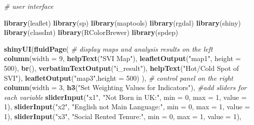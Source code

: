 \documentclass[]{article}
\newenvironment{Shaded}{\begin{snugshade}}{\end{snugshade}}
\newcommand{\KeywordTok}[1]{\textcolor[rgb]{0.13,0.29,0.53}{\textbf{#1}}}
\newcommand{\DataTypeTok}[1]{\textcolor[rgb]{0.13,0.29,0.53}{#1}}
\newcommand{\DecValTok}[1]{\textcolor[rgb]{0.00,0.00,0.81}{#1}}
\newcommand{\StringTok}[1]{\textcolor[rgb]{0.31,0.60,0.02}{#1}}
\newcommand{\CommentTok}[1]{\textcolor[rgb]{0.56,0.35,0.01}{\textit{#1}}}
\newcommand{\NormalTok}[1]{#1}
\begin{document}
\begin{Shaded}
\begin{Highlighting}[]
\CommentTok{# user interface}

\KeywordTok{library}\NormalTok{(leaflet)}
\KeywordTok{library}\NormalTok{(sp)}
\KeywordTok{library}\NormalTok{(maptools)}
\KeywordTok{library}\NormalTok{(rgdal)}
\KeywordTok{library}\NormalTok{(shiny)}
\KeywordTok{library}\NormalTok{(classInt)}
\KeywordTok{library}\NormalTok{(RColorBrewer)}
\KeywordTok{library}\NormalTok{(spdep)}

\KeywordTok{shinyUI}\NormalTok{(}\KeywordTok{fluidPage}\NormalTok{(}
  \CommentTok{# display maps and analysis results on the left}
  \KeywordTok{column}\NormalTok{(}\DataTypeTok{width =} \DecValTok{9}\NormalTok{,}
         \KeywordTok{helpText}\NormalTok{(}\StringTok{"SVI Map"}\NormalTok{),}
         \KeywordTok{leafletOutput}\NormalTok{(}\StringTok{"map1"}\NormalTok{, }\DataTypeTok{height =} \DecValTok{500}\NormalTok{),}
         \KeywordTok{br}\NormalTok{(),}
         \KeywordTok{verbatimTextOutput}\NormalTok{(}\StringTok{"i_result"}\NormalTok{),}
         \KeywordTok{helpText}\NormalTok{(}\StringTok{"Hot/Cold Spot of SVI"}\NormalTok{),}
         \KeywordTok{leafletOutput}\NormalTok{(}\StringTok{"map3"}\NormalTok{,}\DataTypeTok{height =} \DecValTok{500}\NormalTok{)}
\NormalTok{  ),}
  \CommentTok{# control panel on the right}
  \KeywordTok{column}\NormalTok{(}\DataTypeTok{width =} \DecValTok{3}\NormalTok{,}
             \KeywordTok{h3}\NormalTok{(}\StringTok{"Set Weighting Values for Indicators"}\NormalTok{),}
             \CommentTok{#add sliders for each variable}
             \KeywordTok{sliderInput}\NormalTok{(}\StringTok{"x1"}\NormalTok{, }\StringTok{"Not Born in UK:"}\NormalTok{,}
                         \DataTypeTok{min =} \DecValTok{0}\NormalTok{, }\DataTypeTok{max =} \DecValTok{1}\NormalTok{,}
                         \DataTypeTok{value =} \DecValTok{1}\NormalTok{),}
             \KeywordTok{sliderInput}\NormalTok{(}\StringTok{"x2"}\NormalTok{, }\StringTok{"English not Main Language:"}\NormalTok{,}
                         \DataTypeTok{min =} \DecValTok{0}\NormalTok{, }\DataTypeTok{max =} \DecValTok{1}\NormalTok{,}
                         \DataTypeTok{value =} \DecValTok{1}\NormalTok{),}
             \KeywordTok{sliderInput}\NormalTok{(}\StringTok{"x3"}\NormalTok{, }\StringTok{"Social Rented Tenure:"}\NormalTok{,}
                         \DataTypeTok{min =} \DecValTok{0}\NormalTok{, }\DataTypeTok{max =} \DecValTok{1}\NormalTok{,}
                         \DataTypeTok{value =} \DecValTok{1}\NormalTok{),}

\end{Highlighting}
\end{Shaded}
\end{document}
